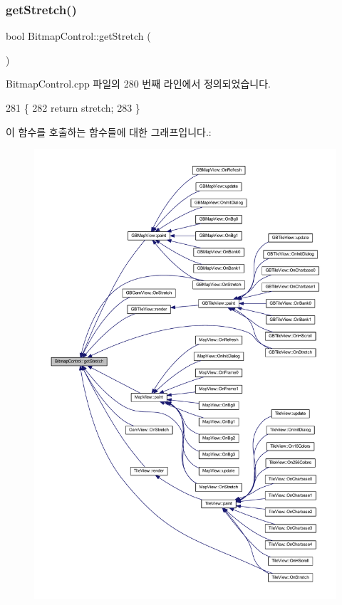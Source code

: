 \subsubsection{\texorpdfstring{get\+Stretch()}{getStretch()}}
{\footnotesize\ttfamily bool Bitmap\+Control\+::get\+Stretch (\begin{DoxyParamCaption}{ }\end{DoxyParamCaption})}



Bitmap\+Control.\+cpp 파일의 280 번째 라인에서 정의되었습니다.


\begin{DoxyCode}
281 \{
282   \textcolor{keywordflow}{return} stretch;
283 \}
\end{DoxyCode}
이 함수를 호출하는 함수들에 대한 그래프입니다.\+:
\nopagebreak
\begin{figure}[H]
\begin{center}
\leavevmode
\includegraphics[width=350pt]{class_bitmap_control_a1d3cff9a3b57dd7558d678177dcf4b5c_icgraph}
\end{center}
\end{figure}
\mbox{\label{class_bitmap_control_a76ead24c70d33421148716a39cf3a17f}} 
